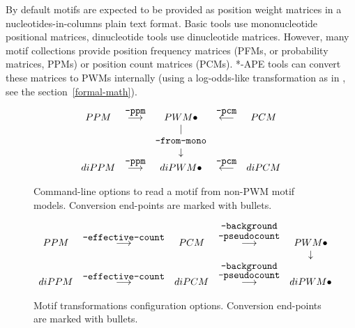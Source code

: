 By default motifs are expected to be provided as position weight matrices in a nucleotides-in-columns plain text format. Basic tools use mononucleotide positional matrices, dinucleotide tools use dinucleotide matrices. However, many motif collections provide position frequency matrices (PFMs, or probability matrices, PPMs) or position count matrices (PCMs). *-APE tools can convert these matrices to PWMs internally (using a log-odds-like transformation as in \cite{Lifanov2003}, see the section~\ref{formal-math}).


\begin{figure}[h]
\centering
$$\begin{array}{ccccc}
PPM     &  \stackrel{\mbox{\texttt{--ppm}}}{\longrightarrow}  & PWM \bullet               & \stackrel{\mbox{\texttt{--pcm}}}{\longleftarrow}  &  PCM  \\
        &                                                 &          |                &                                               &  \\
        &                                                 & \mbox{\texttt{--from-mono}}   &                                               &  \\
        &                                                 &     \downarrow            &                                               &  \\
diPPM   &  \stackrel{\mbox{\texttt{--ppm}}}{\longrightarrow}  & diPWM \bullet             & \stackrel{\mbox{\texttt{--pcm}}}{\longleftarrow}  &  diPCM
\end{array}$$
\caption{Command-line options to read a motif from non-PWM motif models. Conversion end-points are marked with bullets.}\label{motif-conversion-types}
\end{figure}


\begin{figure}[h]
\centering
$$\begin{array}{ccccc}
PPM   & \stackrel{\mbox{\texttt{--effective-count}}}{\longrightarrow} & PCM   & \stackrel{\mbox{\texttt{--background}}}{\stackrel{\mbox{\texttt{--pseudocount}}}{\longrightarrow}} & PWM \bullet \\
      &                                                           &       &                                                                                            & \downarrow \\
diPPM & \stackrel{\mbox{\texttt{--effective-count}}}{\longrightarrow} & diPCM & \stackrel{\stackrel{\mbox{\texttt{--background}}}{\mbox{\texttt{--pseudocount}}}}{\longrightarrow} & diPWM \bullet
\end{array}$$
\caption{Motif transformations configuration options. Conversion end-points are marked with bullets.}\label{motif-conversion-configuration}
\end{figure}


